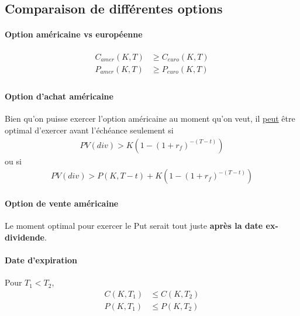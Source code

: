 \documentclass[10pt, french]{article}
\begin{document}
\begin{multicols*}{2}
\subsection*{Comparaison de différentes options}
\paragraph{Option américaine vs européenne}
\begin{align*}
C_{amer}(K,T) & \geq C_{euro}(K,T) \\
P_{amer}(K,T) & \geq P_{euro}(K,T) \\
\end{align*}

\paragraph{Option d'achat américaine}
Bien qu'on puisse exercer l'option américaine au moment qu'on veut, il \underline{peut} être optimal d'exercer avant l'échéance seulement si
\begin{align*}
PV(div) > K \left(1 - (1+r_f)^{-(T-t)} \right)
\end{align*}
ou si
\begin{align*}
PV(div) > P(K, T-t) + K \left(1 - (1+r_f)^{-(T-t)} \right)
\end{align*}

\paragraph{Option de vente américaine}
Le moment optimal pour exercer le Put serait tout juste \textbf{après la date ex-dividende}.



\paragraph{Date d'expiration}
Pour $T_1 < T_2$,
\begin{align*}
C(K, T_1) & \leq C(K, T_2) \\ 
P(K, T_1) & \leq P(K, T_2)
\end{align*}



\end{multicols*}
\end{document}
